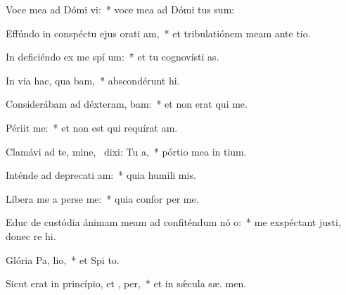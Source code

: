 \item Voce mea ad Dómi vi:~* voce mea ad Dómi tus sum:
\item Effúndo in conspéctu ejus orati am,~* et tribulatiónem meam ante  tio.
\item In deficiéndo ex me spí um:~* et tu cognovísti  as.
\item In via hac, qua bam,~* abscondérunt  hi.
\item Considerábam ad déxteram,  bam:~* et non erat qui  me.
\item Périit   me:~* et non est qui requírat  am.
\item Clamávi ad te, mine,~\pscross{} dixi: Tu   a,~* pórtio mea in  tium.
\item Inténde ad deprecati am:~* quia humili  mis.
\item Líbera me a perse me:~* quia confor  per me.
\item Educ de custódia ánimam meam ad confiténdum nó o:~* me exspéctant justi, donec re hi.
\item Glória Pa,  lio,~* et Spi to.
\item Sicut erat in princípio, et ,  per,~* et in sǽcula sæ. men.
